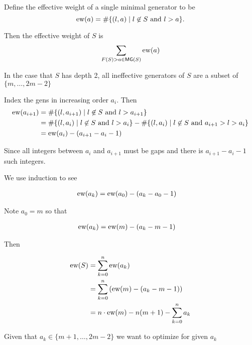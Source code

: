 \documentclass[11pt]{article}
\begin{document}
Define the effective weight of a single minimal generator to be \[\text{ew}(a) = \#\{(l, a) \mid l \not\in S \text{ and } l > a\}.\]

Then the effective weight of \(S\) is \[\sum\limits_{F(S) > a \in \mathsf{MG}(S)} \text{ew}(a)\]

In the case that \(S\) has depth 2, all ineffective generators of \(S\) are a subset of \(\{m, \dots, 2m -2 \}\)

Index the gens in increasing order \(a_i\). Then \begin{align*}
    \text{ew}(a_{i+1}) &= \#\{(l, a_{i+1}) \mid l \not\in S \text{ and } l > a_{i+1}\} \\
    &= \#\{(l, a_{i}) \mid l \not\in S \text{ and } l > a_i\} - \#\{(l, a_{i}) \mid l \not\in S \text{ and } a_{i+1} > l > a_{i}\}\\
    &= \text{ew}(a_i) - (a_{i+1} - a_i - 1)
\end{align*}

Since all integers between \(a_i\) and \(a_{i+1}\) must be gaps and there is \(a_{i+1} - a_i - 1\) such integers.

We use induction to see

\begin{align*}
    \text{ew}(a_{k}) &= \text{ew}(a_0) - (a_{k} - a_0 - 1)
\end{align*}

Note \(a_0 = m\) so that 

\begin{align*}
    \text{ew}(a_{k}) &= \text{ew}(m) - (a_{k} - m - 1)
\end{align*}

Then 

\begin{align*}
    \text{ew}(S) &= \sum\limits_{k = 0}^n \text{ew}(a_{k})\\
    &= \sum\limits_{k = 0}^n \left( \text{ew}(m) - (a_{k} - m - 1) \right)\\
    &= n \cdot \text{ew}(m) - n (m + 1) - \sum\limits_{k=0}^{n} a_k
\end{align*}

Given that \(a_k \in \{m + 1, \dots, 2m - 2\}\) we want to optimize for given \(a_k\)
\end{document}
